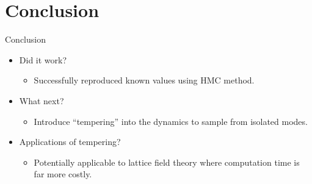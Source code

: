 \documentclass{beamer}
\begin{document}
\section{Conclusion}
\begin{frame}{Conclusion}
\begin{itemize}
  \item<2-> Did it work? 
    \begin{itemize}
        \item<3-> Successfully reproduced known values using HMC method.
    \end{itemize}
  \item<4-> What next?
    \begin{itemize}
        \item<5-> Introduce ``tempering'' into the dynamics to sample from isolated modes.
    \end{itemize}
  \item<6-> Applications of tempering?
  \begin{itemize}
        \item<7-> Potentially applicable to lattice field theory where computation time is far more costly.
    \end{itemize}
\end{itemize}
\end{frame}
\end{document}
